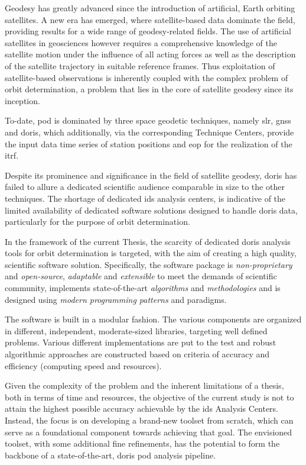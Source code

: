 Geodesy has greatly advanced since the introduction of artificial, Earth orbiting
satellites. A new era has emerged, where satellite-based data dominate the field,
providing results for a wide range of geodesy-related fields.
The use of artificial satellites in geosciences however requires
a comprehensive knowledge of the satellite motion under
the influence of all acting forces as well as the description of the satellite
trajectory in suitable reference frames. Thus exploitation of satellite-based 
observations is inherently coupled with the complex problem of orbit determination, 
a problem that lies in the core of satellite geodesy since its inception.

To-date, \gls{pod} is dominated by three space geodetic techniques, namely \gls{slr}, \gls{gnss} and
\gls{doris}, which additionally, via the corresponding Technique Centers, provide the input
data time series of station positions and \gls{eop} for the realization of the \gls{itrf}.

Despite its prominence and significance in the field of satellite geodesy,
\gls{doris} has failed to allure a dedicated scientific audience comparable in size to
the other techniques. The shortage of dedicated \gls{ids} analysis centers,
is indicative of the limited availability of dedicated software solutions designed to
handle \gls{doris} data, particularly for the purpose of orbit determination.

In the framework of the current Thesis, the scarcity of dedicated \gls{doris}
analysis tools for orbit determination is targeted, with the aim of creating
a high quality, scientific software solution. Specifically, the software 
package is \emph{non-proprietary} and \emph{open-source}, \emph{adaptable} and \emph{extensible} 
to meet the demands of scientific community, implements state-of-the-art \emph{algorithms}
and \emph{methodologies} and is designed using \emph{modern programming patterns} 
and paradigms.

The software is built in a modular fashion. The various components are organized 
in different, independent, moderate-sized libraries, targeting well defined problems.
Various different implementations are put to the test and robust algorithmic 
approaches are constructed based on criteria of accuracy and efficiency
(computing speed and resources).

Given the complexity of the problem and the inherent limitations of a thesis, both in
terms of time and resources, the objective of the current study is not to attain the
highest possible accuracy achievable by the \gls{ids} Analysis Centers. Instead, the
focus is on developing a brand-new toolset from scratch, which can serve as a
foundational component towards achieving that goal. The envisioned toolset, with
some additional fine refinements, has the potential to form the backbone of a
state-of-the-art, \gls{doris} \gls{pod} analysis pipeline.

